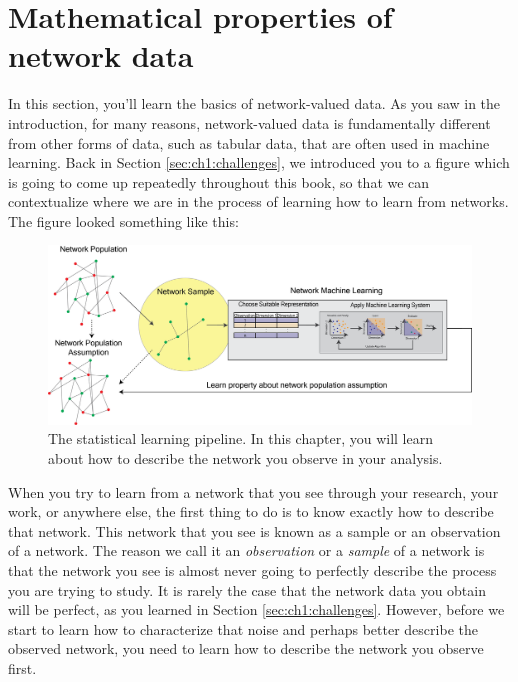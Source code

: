 \chapter{Mathematical properties of network data}
\label{sec:ch4}


In this section, you'll learn the basics of network-valued data. As you saw in the introduction, for many reasons, network-valued data is fundamentally different from other forms of data, such as tabular data, that are often used in machine learning. Back in Section \ref{sec:ch1:challenges}, we introduced you to a figure which is going to come up repeatedly throughout this book, so that we can contextualize where we are in the process of learning {how to learn} from networks. The figure looked something like this:

\begin{figure}[h]
    \centering
    \includegraphics[width=\linewidth]{representations/ch4/Images/network_reps.png}
    \caption[Describing networks schematic]{The statistical learning pipeline. In this chapter, you will learn about how to describe the network you observe in your analysis.}
    \label{fig:ch4:rep_properties}
\end{figure}

When you try to learn from a network that you see through your research, your work, or anywhere else, the first thing to do is to know exactly how to describe that network. This network that you see is known as a {sample} or an {observation} of a network. The reason we call it an \emph{observation} or a \emph{sample} of a network is that the network you see is almost never going to {perfectly} describe the process you are trying to study. It is rarely the case that the network data you obtain will be perfect, as you learned in Section \ref{sec:ch1:challenges}. However, before we start to learn how to characterize that noise and perhaps better describe the observed network, you need to learn how to describe the network you observe first. 

